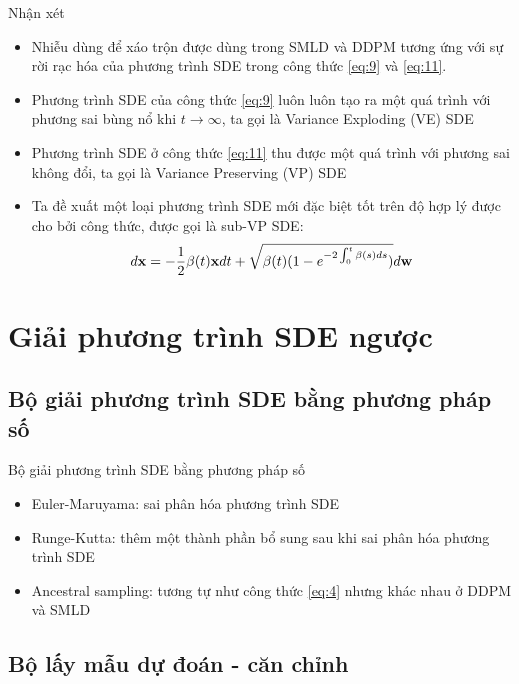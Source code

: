 \documentclass[10pt]{beamer}
\theoremstyle{remark}
\numberwithin{algocf}{section}
\numberwithin{equation}{section}
\numberwithin{dl}{section}
\numberwithin{figure}{section}
\begin{document}
\begin{frame}{Nhận xét}
	\begin{itemize}
		\item Nhiễu dùng để xáo trộn được dùng trong SMLD và DDPM tương ứng với sự rời rạc hóa của phương trình SDE trong công thức \ref{eq:9} và \ref{eq:11}.
		\item Phương trình SDE của công thức \ref{eq:9} luôn luôn tạo ra một quá trình với phương sai bùng nổ khi $t \rightarrow \infty$, ta gọi là Variance Exploding (VE) SDE
		\item Phương trình SDE ở công thức \ref{eq:11} thu được một quá trình với phương sai không đổi, ta gọi là Variance Preserving (VP) SDE
		\item Ta đề xuất một loại phương trình SDE mới đặc biệt tốt trên độ hợp lý được cho bởi công thức, được gọi là sub-VP SDE:
		\begin{equation} \label{eq:12}
			d \bold{x} = -\dfrac{1}{2} \beta(t) \bold{x} dt + \sqrt{\beta(t) (1-e^{-2\int_{0}^{t} \beta(s)ds} )} d \bold{w}
		\end{equation}
	\end{itemize}
\end{frame}

\section{Giải phương trình SDE ngược}

\subsection{Bộ giải phương trình SDE bằng phương pháp số}

\begin{frame}{Bộ giải phương trình SDE bằng phương pháp số}
	\begin{itemize}
		\item Euler-Maruyama: sai phân hóa phương trình SDE
		\item Runge-Kutta: thêm một thành phần bổ sung sau khi sai phân hóa phương trình SDE
		\item Ancestral sampling: tương tự như công thức \ref{eq:4} nhưng khác nhau ở DDPM và SMLD
	\end{itemize}
\end{frame}

\subsection{Bộ lấy mẫu dự đoán - căn chỉnh}
\end{document}

